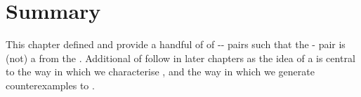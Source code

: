 \section*{Summary}


\begin{note}
  This chapter defined  and provide a handful of  of -- pairs such that the - pair is (not) a \fc{} from the \pool{}.
  Additional  of  follow in later chapters as the idea of a  is central to the way in which we characterise , and the way in which we generate counterexamples to \issueInclusion{}.
\end{note}


